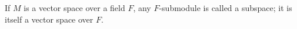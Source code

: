 If $M$ is a vector space over a field $F$, any $F$-submodule is called a subspace; it is itself a vector space over $F$.
